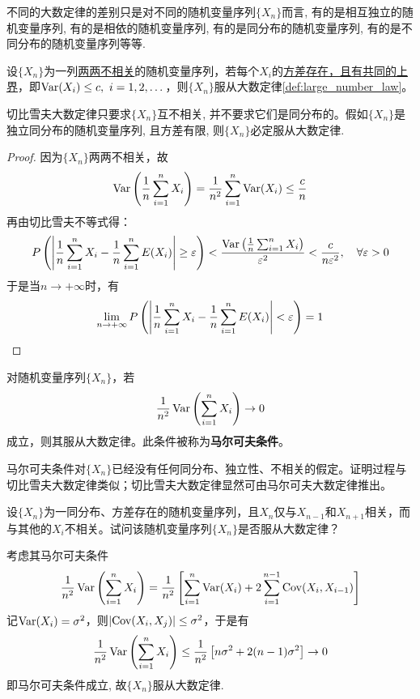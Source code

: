 不同的大数定律的差别只是对不同的随机变量序列$\{ X_n \}$而言, 有的是相互独立的随机变量序列, 有的是相依的随机变量序列, 有的是同分布的随机变量序列, 有的是不同分布的随机变量序列等等.

\begin{theorem}[切比雪夫大数定律]
    设$\{ X_n \}$为一列\underline{两两不相关}的随机变量序列，若每个$X_i$的\underline{方差存在，且有共同的上界}，即$\operatorname{Var}(X_i) \le c ,\ i=1,2, \dotsc$，则$\{ X_n \}$服从大数定律\ref{def:large_number_law}。
\end{theorem}
\begin{remark}
    切比雪夫大数定律只要求$\{ X_n \}$互不相关, 并不要求它们是同分布的。假如$\{ X_n \}$是独立同分布的随机变量序列, 且方差有限, 则$\{ X_n \}$必定服从大数定律.
\end{remark}
\begin{proof}
    因为$\{ X_n \}$两两不相关，故
    \[ \operatorname{Var} \left(\frac1n \sum_{i=1}^n X_i \right) = \frac1{n^2} \sum_{i=1}^n\operatorname{Var}(X_i) \leq \frac{c}{n} \]
    再由切比雪夫不等式得：
    \[ P \left(\left\lvert \frac1n \sum_{i=1}^n X_i - \frac1n \sum_{i=1}^n E(X_i) \right\rvert \ge  \varepsilon \right) < \frac{\operatorname{Var}\left(\frac1n \sum_{i=1}^n X_i \right)}{\varepsilon^2} < \frac{c}{n\varepsilon^2} ,\quad \forall \varepsilon > 0 \]
    于是当$n \to +\infty$时，有
    \[ \lim_{n \to +\infty} P \left(\left\lvert \frac1n \sum_{i=1}^n X_i - \frac1n \sum_{i=1}^n E(X_i) \right\rvert < \varepsilon \right) = 1 \]
\end{proof}

\begin{theorem}[马尔可夫大数定律]
    对随机变量序列$\{ X_n \}$，若
    \[ \frac1{n^2}\operatorname{Var} \left(\sum_{i=1}^n X_i \right) \to 0 \]
    成立，则其服从大数定律。此条件被称为\textbf{马尔可夫条件}。
\end{theorem}
\begin{remark}
    马尔可夫条件对$\{ X_n \}$已经没有任何同分布、独立性、不相关的假定。证明过程与切比雪夫大数定律类似；切比雪夫大数定律显然可由马尔可夫大数定律推出。
\end{remark}

\begin{example}\label{ex:4.2.3}
    设$\{ X_n \}$为一同分布、方差存在的随机变量序列，且$X_n$仅与$X_{n-1}$和$X_{n+1}$相关，而与其他的$X_i$不相关。试问该随机变量序列$\{ X_n \}$是否服从大数定律？
\end{example}
\begin{solution}
    考虑其马尔可夫条件
    \[ \frac1{n^2}\operatorname{Var} \left(\sum_{i=1}^n X_i \right) = \frac1{n^2} \left[ \sum_{i=1}^n \operatorname{Var}(X_i) + 2 \sum_{i=1}^{n-1} \operatorname{Cov}(X_i, X_{i-1})\right] \]
    记$\operatorname{Var}(X_i) = \sigma^2$，则$\left\lvert\operatorname{Cov}(X_i, X_j)\right\rvert\leq \sigma^2$，于是有
    \[ \frac1{n^2}\operatorname{Var} \left(\sum_{i=1}^n X_i \right) \leq \frac1{n^2} \left[n \sigma^2 + 2(n - 1) \sigma^2\right] \to 0 \]
    即马尔可夫条件成立, 故$\{ X_n \}$服从大数定律.
\end{solution}

